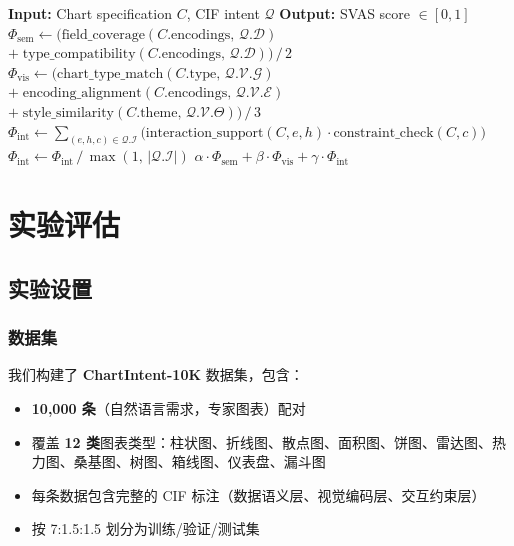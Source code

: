 \documentclass[12pt,a4paper]{ctexart}
\theoremstyle{remark}
\begin{document}
\begin{algorithm}[H]
\caption{SVAS-Evaluate：语义-视觉对齐分数计算}
\label{alg:svas}
\begin{algorithmic}[1]
\State \textbf{Input:} Chart specification $C$, CIF intent $\mathcal{Q}$
\State \textbf{Output:} SVAS score $\in [0, 1]$
\State
\State $\Phi_{\text{sem}} \gets \big(\text{field\_coverage}(C.\text{encodings},\, \mathcal{Q}.\mathcal{D})$
\State \qquad\quad\;\;\; $+ \; \text{type\_compatibility}(C.\text{encodings},\, \mathcal{Q}.\mathcal{D})\big) \,/\, 2$
\State
\State $\Phi_{\text{vis}} \gets \big(\text{chart\_type\_match}(C.\text{type},\, \mathcal{Q}.\mathcal{V}.\mathcal{G})$
\State \qquad\quad\;\; $+ \; \text{encoding\_alignment}(C.\text{encodings},\, \mathcal{Q}.\mathcal{V}.\mathcal{E})$
\State \qquad\quad\;\; $+ \; \text{style\_similarity}(C.\text{theme},\, \mathcal{Q}.\mathcal{V}.\Theta)\big) \,/\, 3$
\State
\State $\Phi_{\text{int}} \gets \sum_{(e, h, c) \in \mathcal{Q}.\mathcal{I}}
        \big(\text{interaction\_support}(C, e, h) \cdot \text{constraint\_check}(C, c)\big)$
\State $\Phi_{\text{int}} \gets \Phi_{\text{int}} \,/\, \max(1,\, |\mathcal{Q}.\mathcal{I}|)$
\State
\State \Return $\alpha \cdot \Phi_{\text{sem}} + \beta \cdot \Phi_{\text{vis}} + \gamma \cdot \Phi_{\text{int}}$
\end{algorithmic}
\end{algorithm}

\section{实验评估}

\subsection{实验设置}

\subsubsection{数据集}

我们构建了 \textbf{ChartIntent-10K} 数据集，包含：
\begin{itemize}[leftmargin=*]
    \item \textbf{10,000 条}（自然语言需求，专家图表）配对
    \item 覆盖 \textbf{12 类}图表类型：柱状图、折线图、散点图、面积图、饼图、雷达图、热力图、桑基图、树图、箱线图、仪表盘、漏斗图
    \item 每条数据包含完整的 CIF 标注（数据语义层、视觉编码层、交互约束层）
    \item 按 7:1.5:1.5 划分为训练/验证/测试集
\end{itemize}
\end{document}
